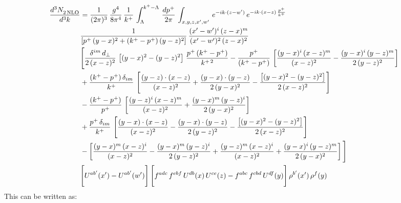 \documentclass[9pt]{article}
\numberwithin{equation}{section}
\begin{document}
\begin{align}
    \frac{d^{3}N_{2\,\rm NLO}^{\rm}}{d^{3}k}  & =  \frac{1}{(2\pi)^{3}}\,\frac{g^{4}}{8\pi^{4}}\,\frac{1}{k^{+}}\,\int_{\Lambda}^{k^{+}-\Lambda}\, \frac{dp^{+}}{2\pi} \,\int_{x,y,z,x',w'}\,e^{-ik\cdot(z-w')}\,e^{-ik\cdot (x-z)\,\frac{p^{+}}{k^{+}}}\,\notag \\ & \frac{1}{\left[p^{+}\,(y-x)^{2}+(k^{+}-p^{+})\,(y-z)^{2}\right]}\, \frac{(x'-w')^{i}\,(z-x)^{m}}{(x'-w')^{2}\,(z-x)^{2}} \notag \\ & \Bigg[\frac{\delta^{im}\,d_{\perp}}{2\,(x-z)^{2}}\,\left[(y-x)^{2}-(y-z)^{2}\right]\,\frac{p^{+}\,(k^{+}-p^{+})}{k^{+\,2}}-\frac{p^{+}}{(k^{+}-p^{+})}\,\left[\frac{(y-x)^{i}\,(x-z)^{m}}{(x-z)^{2}}-\frac{(y-x)^{i}\,(y-z)^{m}}{2\,(y-z)^{2}}\right]\notag \\ & +\frac{(k^{+}-p^{+})\,\delta_{im}}{k^{+}}\,\left[\frac{(y-z)\cdot (x-z)}{(x-z)^{2}}+\frac{(y-x)\cdot (y-z)}{2\,(y-x)^{2}}-\frac{\left[(y-x)^{2}-(y-z)^{2}\right]}{2\,(x-z)^{2}}\right]\notag \\ & -\frac{(k^{+}-p^{+})}{p^{+}}\,\left[\frac{(y-z)^{i}\,(x-z)^{m}}{(x-z)^{2}}+\frac{(y-x)^{m}\,(y-z)^{i}}{2\,(y-x)^{2}}\right]\notag \\ & +\frac{p^{+}\,\delta_{im}}{k^{+}}\,\left[\frac{(y-x)\cdot (x-z)}{(x-z)^{2}}-\frac{(y-x)\cdot (y-z)}{2\,(y-z)^{2}}-\frac{\left[(y-x)^{2}-(y-z)^{2}\right]}{2\,(x-z)^{2}}\right]\notag \\ &-\left[\frac{(y-x)^{m}\,(x-z)^{i}}{(x-z)^{2}}-\frac{(y-x)^{m}\,(y-z)^{i}}{2\,(y-z)^{2}}+\frac{(y-z)^{m}\,(x-z)^{i}}{(x-z)^{2}}+\frac{(y-x)^{i}\,(y-z)^{m}}{2\,(y-x)^{2}}\right]\Bigg] \notag \\ & \Bigg[U^{ab'}(x')-U^{ab'}(w')\Bigg]\,\Bigg[f^{adc}\,f^{ebf}\,U^{db}(x)\,U^{ce}(z)-f^{abc}\,f^{cbd}\,U^{df}(y)\Bigg]\,\rho^{b'}(x')\,\rho^{f}(y)
\end{align}
This can be written as: 
\end{document}
